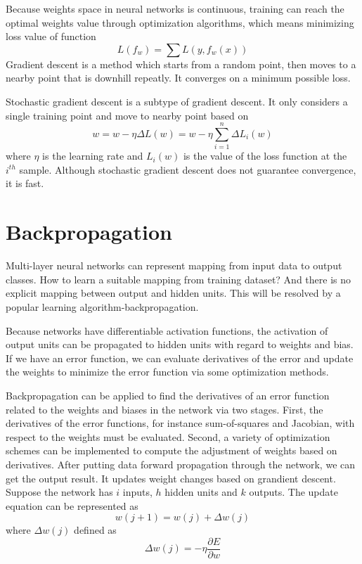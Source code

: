 Because weights space in neural networks is continuous, training can reach the optimal weights value through optimization algorithms, which means minimizing loss value of function
\begin{equation}\label{eq:LossMin}
L(f_{w}) = \sum L(y, f_{w}(x))
\end{equation}
Gradient descent is a method which starts from a random point, then moves to a nearby point that is downhill repeatly. It converges on a minimum possible loss.

Stochastic gradient descent is a subtype of gradient descent. It only considers a single training point and move to nearby point based on
\begin{equation}\label{eq:SGDUpdate}
w = w - \eta  \Delta L(w) = w - \eta \sum_{i=1}^{n} \Delta L_{i}(w)
\end{equation}
where $\eta$ is the learning rate and $L_{i}(w)$ is the value of the loss function at the $i^{th}$ sample. Although stochastic gradient descent does not guarantee convergence, it is fast.

\section{Backpropagation}

Multi-layer neural networks can represent mapping from input data to output classes. How to learn a suitable mapping from training dataset? And there is no explicit mapping between output and hidden units. This will be resolved by a popular learning algorithm-backpropagation.

Because networks have differentiable activation functions, the activation of output units can be propagated to hidden units with regard to weights and bias. If we have an error function, we can evaluate derivatives of the error and update the weights to minimize the error function via some optimization methods.

Backpropagation can be applied to find the derivatives of an error function related to the weights and biases in the network via two stages. First, the derivatives of the error functions, for instance sum-of-squares and Jacobian, with respect to the weights must be evaluated. Second, a variety of optimization schemes can be implemented to compute the adjustment of weights based on derivatives. After putting data forward propagation through the network, we can get the output result. It updates weight changes based on grandient descent. Suppose the network has $i$ inputs, $h$ hidden units and $k$ outputs. The update equation can be represented as 
\begin{equation}\label{eq:UpdateWeights}
w(j+1) = w(j) + \Delta w(j)
\end{equation}
where $\Delta w(j)$ defined as 
\begin{equation}\label{eq:DeltaWeights}
\Delta w(j) = -\eta \frac{\partial E}{\partial w}
\end{equation}

